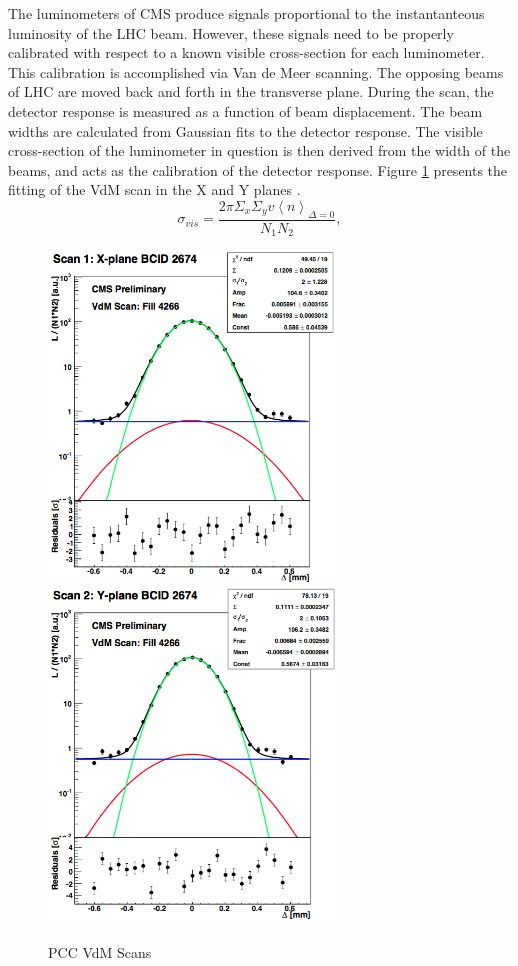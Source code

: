 The luminometers of CMS produce signals proportional to the instantanteous luminosity of the LHC beam. However, these signals need to be properly calibrated with respect to a known visible cross-section for each luminometer. This calibration is accomplished via Van de Meer scanning. The opposing beams of LHC are moved back and forth in the transverse plane. During the scan, the detector response is measured as a function of beam displacement. The beam widths are calculated from Gaussian fits to the detector response. The visible cross-section of the luminometer in question is then derived from the width of the beams, and acts as the calibration of the detector response. Figure \ref{fig:pccVdMScans} presents the fitting of the VdM scan in the X and Y planes \cite{CMS:2013gfa}. 
\begin{equation}
\sigma_{vis} = \frac{2 \pi \Sigma_x \Sigma_y v\left \langle n \right \rangle_{\Delta=0}}{N_1 N_2},
\end{equation}

\begin{figure}[]
\begin{centering}
\includegraphics[width=3in]{Chapter4/importfigs/CMS-PAS-LUM-15-001_Figure_005-a.png}
\includegraphics[width=3in]{Chapter4/importfigs/CMS-PAS-LUM-15-001_Figure_005-b.png}
\par\end{centering}
\caption{PCC VdM Scans \cite{CMS:2013gfa} \label{fig:pccVdMScans}}
\end{figure}

